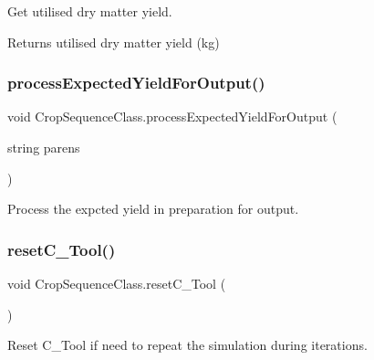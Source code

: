 Get utilised dry matter yield. 

\begin{DoxyReturn}{Returns}
utilised dry matter yield (kg) 
\end{DoxyReturn}
\mbox{\label{class_crop_sequence_class_aff5bfa87d2cc1dea5dea8f29a4df32f0}} 
\subsubsection{\texorpdfstring{processExpectedYieldForOutput()}{processExpectedYieldForOutput()}}
{\footnotesize\ttfamily void Crop\+Sequence\+Class.\+process\+Expected\+Yield\+For\+Output (\begin{DoxyParamCaption}\item[{string}]{parens }\end{DoxyParamCaption})\hspace{0.3cm}{\ttfamily [inline]}}



Process the expcted yield in preparation for output. 

\mbox{\label{class_crop_sequence_class_ad7552e1e3639be6dbd5668e7d458b263}} 
\subsubsection{\texorpdfstring{resetC\_Tool()}{resetC\_Tool()}}
{\footnotesize\ttfamily void Crop\+Sequence\+Class.\+reset\+C\+\_\+\+Tool (\begin{DoxyParamCaption}{ }\end{DoxyParamCaption})\hspace{0.3cm}{\ttfamily [inline]}}



Reset C\+\_\+\+Tool if need to repeat the simulation during iterations. 

\mbox{\label{class_crop_sequence_class_ae0df410d4d819c07bcc6f3b4ad00cd8b}} 
